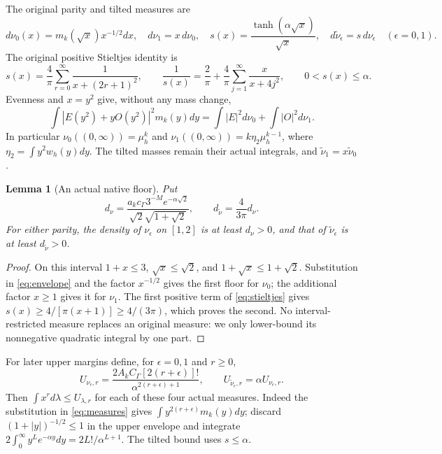 \documentclass[11pt]{article}
\newtheorem{lemma}[theorem]{Lemma}
\begin{document}
The original parity and tilted measures are
\begin{equation}\label{eq:measures}
 d\nu_0(x)=m_k(\sqrt x)x^{-1/2}dx,\quad d\nu_1=x\,d\nu_0,
 \quad s(x)=\frac{\tanh(\alpha\sqrt x)}{\sqrt x},\quad
 d\widetilde\nu_\epsilon=s\,d\nu_\epsilon\quad(\epsilon=0,1).
\end{equation}
The original positive Stieltjes identity \cite{PP,FM} is
\begin{equation}\label{eq:stieltjes}
 s(x)=\frac4\pi\sum_{r=0}^\infty\frac1{x+(2r+1)^2},\qquad
 \frac1{s(x)}=\frac2\pi+\frac4\pi\sum_{j=1}^\infty\frac{x}{x+4j^2},
 \qquad 0<s(x)\le\alpha.
\end{equation}
Evenness and $x=y^2$ give, without any mass change,
\[
 \int|E(y^2)+yO(y^2)|^2m_k(y)dy
 =\int|E|^2d\nu_0+\int|O|^2d\nu_1.
\]
In particular $\nu_0((0,\infty))=\mu_h^k$ and
$\nu_1((0,\infty))=k\eta_2\mu_h^{k-1}$, where
$\eta_2=\int y^2w_h(y)dy$. The tilted masses remain their actual
integrals, and $\widetilde\nu_1=x\widetilde\nu_0$.

\begin{lemma}[An actual native floor]\label{lem:floor}
Put
\begin{equation}\label{eq:densityfloor}
 d_\nu=\frac{a_kc_\Gamma3^{-M}e^{-\alpha\sqrt2}}
 {\sqrt2\sqrt{1+\sqrt2}},\qquad
 d_{\widetilde\nu}=\frac4{3\pi}d_\nu.
\end{equation}
For either parity, the density of $\nu_\epsilon$ on $[1,2]$ is at
least $d_\nu>0$, and that of $\widetilde\nu_\epsilon$ is at least
$d_{\widetilde\nu}>0$.
\end{lemma}
\begin{proof}
On this interval $1+x\le3$, $\sqrt x\le\sqrt2$, and
$1+\sqrt x\le1+\sqrt2$. Substitution in \eqref{eq:envelope}
and the factor $x^{-1/2}$ gives the first floor for $\nu_0$;
the additional factor $x\ge1$ gives it for $\nu_1$.
The first positive term of \eqref{eq:stieltjes} gives
$s(x)\ge4/[\pi(x+1)]\ge4/(3\pi)$, which proves the second.
No interval-restricted measure replaces an original measure: we
only lower-bound its nonnegative quadratic integral by one part.
\end{proof}

For later upper margins define, for $\epsilon=0,1$ and $r\ge0$,
\begin{equation}\label{eq:momentcaps}
 U_{\nu_\epsilon,r}=
 \frac{2A_kC_\Gamma[2(r+\epsilon)]!}
 {\alpha^{2(r+\epsilon)+1}},\qquad
 U_{\widetilde\nu_\epsilon,r}=\alpha U_{\nu_\epsilon,r}.
\end{equation}
Then $\int x^r d\lambda\le U_{\lambda,r}$ for each of these
four actual measures. Indeed the substitution in
\eqref{eq:measures} gives $\int y^{2(r+\epsilon)}m_k(y)dy$;
discard $(1+|y|)^{-1/2}\le1$ in the upper envelope and integrate
$2\int_0^\infty y^Le^{-\alpha y}dy=2L!/\alpha^{L+1}$.
The tilted bound uses $s\le\alpha$.
\end{document}
